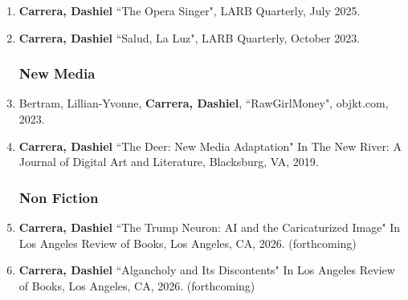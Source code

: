  \begin{enumerate}
 
 
\subsubsection{Short Fiction}
\item \textbf{Carrera, Dashiel} ``The Opera Singer", LARB Quarterly, July 2025. \\
\item \textbf{Carrera, Dashiel} ``Salud, La Luz", LARB Quarterly, October 2023. \\


\subsubsection{New Media}
\item Bertram, Lillian-Yvonne, \textbf{Carrera, Dashiel}, ``RawGirlMoney", objkt.com, 2023.
\item \textbf{Carrera, Dashiel} ``The Deer: New Media Adaptation" In The New River: A Journal of Digital Art and Literature, Blacksburg, VA, 2019.\\

\subsubsection{Non Fiction}

\item \textbf{Carrera, Dashiel}  ``The Trump Neuron: AI and the Caricaturized Image" In Los Angeles Review of Books, Los Angeles, CA, 2026. (forthcoming)\\

\item \textbf{Carrera, Dashiel}  ``Algancholy and Its Discontents" In Los Angeles Review of Books, Los Angeles, CA, 2026. (forthcoming)\\


\end{enumerate}
